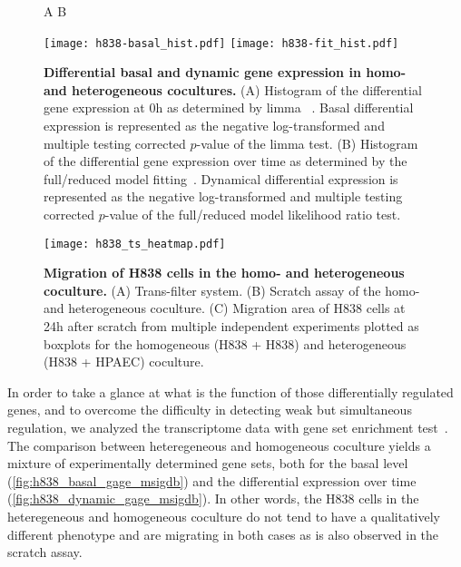 \begin{figure}[!ht]
\hskip 0.5in A \hskip 2.5in B
\begin{center}
\texttt{[image: h838-basal\_hist.pdf]}
\texttt{[image: h838-fit\_hist.pdf]}
\end{center}
\caption[Differential basal and dynamic gene expression]{
{\bf Differential basal and dynamic gene expression in homo- and heterogeneous 
cocultures.} 
(A) Histogram of the differential gene expression at 0h as determined by limma~%
\citep{Smyth2004}. 
Basal differential expression is 
represented as the negative log-transformed and multiple
testing corrected $p$-value of the limma test.
(B) Histogram of the differential gene expression over time as determined by the
full/reduced model fitting~\citep{Mar2009}.
Dynamical differential expression is 
represented as the negative log-transformed and multiple
testing corrected $p$-value of the full/reduced model
likelihood ratio test.
}
\label{fig:h838_transcriptome}
\end{figure}

\begin{figure}[!ht]
\begin{center}
\texttt{[image: h838\_ts\_heatmap.pdf]}
\end{center}
\caption[H838 migration in homo- and heterogeneous coculture]{
{\bf Migration of H838 cells in the homo- and heterogeneous coculture.} 
(A) Trans-filter system. (B) Scratch assay of the homo- and heterogeneous coculture.
(C) Migration area of H838 cells at 24h after scratch from multiple independent 
experiments 
plotted as 
boxplots for the homogeneous (H838 + H838) and heterogeneous (H838 + HPAEC) 
coculture.
}
\label{fig:h838_ts}
\end{figure}

In order to take a glance at what is the function of those
differentially regulated genes, and to overcome the difficulty in detecting weak
but simultaneous regulation, we analyzed the transcriptome data with gene set
enrichment test~\citep{Luo2009}.
The comparison between heteregeneous and homogeneous coculture yields 
a mixture of experimentally determined gene sets, both for the basal level
(\ref{fig:h838_basal_gage_msigdb})
and the differential expression over time (\ref{fig:h838_dynamic_gage_msigdb}).
In other words, the H838 cells in the heteregeneous and homogeneous coculture
do not tend to have a qualitatively different phenotype and are migrating in
both cases as is also observed in the scratch assay.

